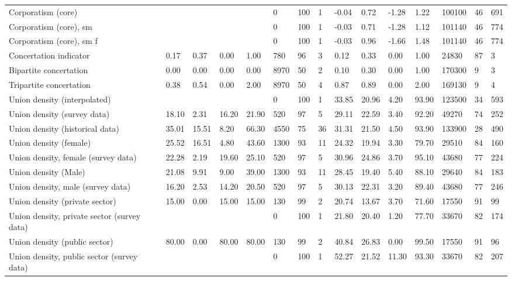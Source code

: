 \begin{longtable}{lllllllllllllll}
Corporatism (core) &  &  &  &  & 0 & 100 & 1 & -0.04 & 0.72 & -1.28 & 1.22 & 100100 & 46 & 691\\
\addlinespace
Corporatism (core), sm &  &  &  &  & 0 & 100 & 1 & -0.03 & 0.71 & -1.28 & 1.12 & 101140 & 46 & 774\\
Corporatism (core), sm f &  &  &  &  & 0 & 100 & 1 & -0.03 & 0.96 & -1.66 & 1.48 & 101140 & 46 & 774\\
Concertation indicator & 0.17 & 0.37 & 0.00 & 1.00 & 780 & 96 & 3 & 0.12 & 0.33 & 0.00 & 1.00 & 24830 & 87 & 3\\
Bipartite concertation & 0.00 & 0.00 & 0.00 & 0.00 & 8970 & 50 & 2 & 0.10 & 0.30 & 0.00 & 1.00 & 170300 & 9 & 3\\
Tripartite concertation & 0.38 & 0.54 & 0.00 & 2.00 & 8970 & 50 & 4 & 0.87 & 0.89 & 0.00 & 2.00 & 169130 & 9 & 4\\
\addlinespace
Union density (interpolated) &  &  &  &  & 0 & 100 & 1 & 33.85 & 20.96 & 4.20 & 93.90 & 123500 & 34 & 593\\
Union density (survey data) & 18.10 & 2.31 & 16.20 & 21.90 & 520 & 97 & 5 & 29.11 & 22.59 & 3.40 & 92.20 & 49270 & 74 & 252\\
Union density (historical data) & 35.01 & 15.51 & 8.20 & 66.30 & 4550 & 75 & 36 & 31.31 & 21.50 & 4.50 & 93.90 & 133900 & 28 & 490\\
Union density (female) & 25.52 & 16.51 & 4.80 & 43.60 & 1300 & 93 & 11 & 24.32 & 19.94 & 3.30 & 79.70 & 29510 & 84 & 160\\
Union density, female (survey data) & 22.28 & 2.19 & 19.60 & 25.10 & 520 & 97 & 5 & 30.96 & 24.86 & 3.70 & 95.10 & 43680 & 77 & 224\\
\addlinespace
Union density (Male) & 21.08 & 9.91 & 9.00 & 39.00 & 1300 & 93 & 11 & 28.45 & 19.40 & 5.40 & 88.10 & 29640 & 84 & 183\\
Union density, male (survey data) & 16.20 & 2.53 & 14.20 & 20.50 & 520 & 97 & 5 & 30.13 & 22.31 & 3.20 & 89.40 & 43680 & 77 & 246\\
Union density (private sector) & 15.00 & 0.00 & 15.00 & 15.00 & 130 & 99 & 2 & 20.74 & 13.67 & 3.70 & 71.60 & 17550 & 91 & 99\\
Union density, private sector (survey data) &  &  &  &  & 0 & 100 & 1 & 21.80 & 20.40 & 1.20 & 77.70 & 33670 & 82 & 174\\
Union density (public sector) & 80.00 & 0.00 & 80.00 & 80.00 & 130 & 99 & 2 & 40.84 & 26.83 & 0.00 & 99.50 & 17550 & 91 & 96\\
\addlinespace
Union density, public sector (survey data) &  &  &  &  & 0 & 100 & 1 & 52.27 & 21.52 & 11.30 & 93.30 & 33670 & 82 & 207\\

\end{longtable}
